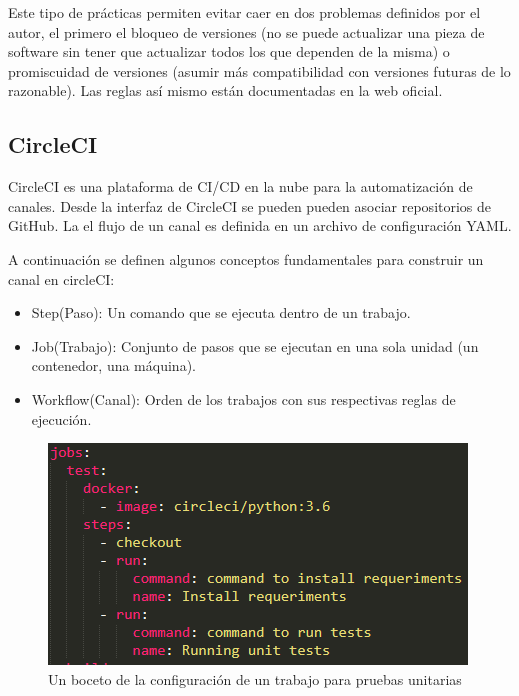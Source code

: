 Este tipo de prácticas permiten evitar caer en dos problemas definidos por el autor, el primero el bloqueo de versiones (no se puede actualizar una pieza de software sin tener que actualizar todos los que dependen de la misma) o promiscuidad de versiones (asumir más compatibilidad con versiones futuras de lo razonable). Las reglas así mismo están documentadas en la web oficial.

\subsection{CircleCI}

CircleCI \cite {circleci} es una plataforma de CI/CD en la nube para la automatización de canales. Desde la interfaz de CircleCI se pueden pueden asociar repositorios de  GitHub. La el flujo de un canal es definida en un archivo de configuración YAML.

A continuación se definen algunos conceptos fundamentales para construir un canal en circleCI:

\begin{itemize}
	\item Step(Paso): Un comando que se ejecuta dentro de un trabajo.
	\item Job(Trabajo): Conjunto de pasos que se ejecutan en una sola unidad (un contenedor, una máquina).
	\item Workflow(Canal): Orden de los trabajos con sus respectivas reglas de ejecución.
\end{itemize}

\begin{figure}[H]
	\centering
	\includegraphics[width=\linewidth]{bibliografia/Imagenes/job.PNG}
	\caption{Un boceto de la configuración de un trabajo para pruebas unitarias}
	\label{jobcircle}
\end{figure}


